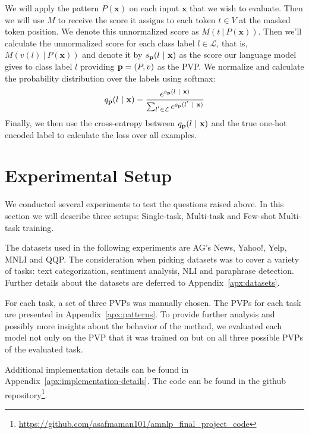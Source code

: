 \documentclass[11pt,a4paper]{article}
\begin{document}
We will apply the pattern $P(\textbf{x})$ on each input $\textbf{x}$ that we wish to evaluate.
Then we will use $M$ to receive the score it assigns to each token $t\in{}V$ at the masked token position.
We denote this unnormalized score as $M(t\ |\ P(\textbf{x}))$.
Then we'll calculate the unnormalized score for each class label $l\in{}\mathcal{L}$, that is, $M(v(l)\ |\ P(\textbf{x}))$ and denote it by $s_{\text{\textbf{p}}}(l\ |\ \textbf{x})$ as the score our language model gives to class label $l$ providing $\text{\textbf{p}}=(P, v)$ as the PVP.
We normalize and calculate the probability distribution over the labels using softmax:
\[
	q_\text{\textbf{p}}(l\ |\ \textbf{x}) = \frac{e^{s_{\text{\textbf{p}}}(l\ |\ \textbf{x})}}{\sum_{l^{'}\in{}\mathcal{L}}e^{s_{\text{\textbf{p}}}(l^{'}\ |\ \textbf{x})}}
\]
Finally, we then use the cross-entropy between $q_\text{\textbf{p}}(l\ |\ \textbf{x})$ and the true one-hot encoded label to calculate the loss over all examples. 

\section{Experimental Setup}
\label{sec:experiments}



We conducted several experiments to test the questions raised above.
In this section we will describe three setups: Single-task, Multi-task and Few-shot Multi-task training.

The datasets used in the following experiments are AG's News, Yahoo!, Yelp, MNLI and QQP.
The consideration when picking datasets was to cover a variety of tasks: text categorization, sentiment analysis, NLI and paraphrase detection.
Further details about the datasets are deferred to Appendix~\ref{apx:datasets}.

For each task, a set of three PVPs was manually chosen.
The PVPs for each task are presented in Appendix~\ref{apx:patterns}.
To provide further analysis and possibly more insights about the behavior of the method, we evaluated each model not only on the PVP that it was trained on but on all three possible PVPs of the evaluated task.

Additional implementation details can be found in Appendix~\ref{apx:implementation-details}.
The code can be found in the github repository\footnote{\url{https://github.com/asafmaman101/amnlp_final_project_code}}.
\end{document}
